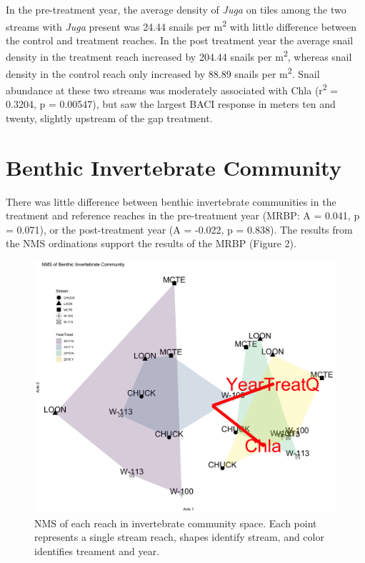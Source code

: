 \documentclass[double,12pt]{beavtex}
\begin{document}
  In the pre-treatment year, the average density of \emph{Juga} on tiles
  among the two streams with \emph{Juga} present was 24.44 snails per
  m\textsuperscript{2} with little difference between the control and
  treatment reaches. In the post treatment year the average snail density
  in the treatment reach increased by 204.44 snails per
  m\textsuperscript{2}, whereas snail density in the control reach only
  increased by 88.89 snails per m\textsuperscript{2}. Snail abundance at
  these two streams was moderately associated with Chla
  (r\textsuperscript{2} = 0.3204, p = 0.00547), but saw the largest BACI
  response in meters ten and twenty, slightly upstream of the gap
  treatment.
  
  \section*{Benthic Invertebrate
  Community}\label{benthic-invertebrate-community}
  
  There was little difference between benthic invertebrate communities in
  the treatment and reference reaches in the pre-treatment year (MRBP: A =
  0.041, p = 0.071), or the post-treatment year (A = -0.022, p = 0.838).
  The results from the NMS ordinations support the results of the MRBP
  (Figure 2).
  
  \begin{figure}
  
  {\centering \includegraphics[width=0.6\linewidth]{Figures/NMS-Benthic-1} 
  
  }
  
  \caption[NMS of each reach in invertebrate community space]{NMS of each reach in invertebrate community space. Each point represents a single stream reach, shapes identify stream, and color identifies treament and year.}\label{fig:unnamed-chunk-2}
  \end{figure}
  
\end{document}
